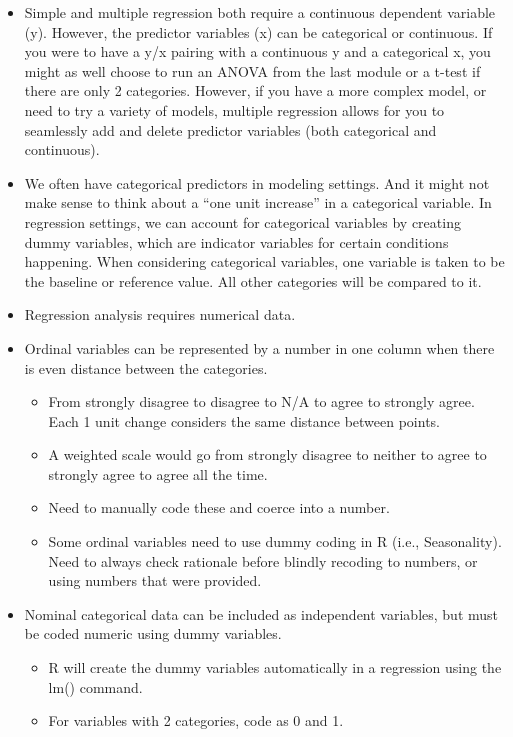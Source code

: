 \documentclass[
  letterpaper,
  DIV=11,
  numbers=noendperiod]{scrreprt}
\providecommand{\tightlist}{%
  \setlength{\itemsep}{0pt}\setlength{\parskip}{0pt}}\usepackage{longtable,booktabs,array}
\begin{document}
\begin{itemize}
\item
  Simple and multiple regression both require a continuous dependent
  variable (y). However, the predictor variables (x) can be categorical
  or continuous. If you were to have a y/x pairing with a continuous y
  and a categorical x, you might as well choose to run an ANOVA from the
  last module or a t-test if there are only 2 categories. However, if
  you have a more complex model, or need to try a variety of models,
  multiple regression allows for you to seamlessly add and delete
  predictor variables (both categorical and continuous).
\item
  We often have categorical predictors in modeling settings. And it
  might not make sense to think about a ``one unit increase'' in a
  categorical variable. In regression settings, we can account for
  categorical variables by creating dummy variables, which are indicator
  variables for certain conditions happening. When considering
  categorical variables, one variable is taken to be the baseline or
  reference value. All other categories will be compared to it.
\item
  Regression analysis requires numerical data.
\item
  Ordinal variables can be represented by a number in one column when
  there is even distance between the categories.

  \begin{itemize}
  \tightlist
  \item
    From strongly disagree to disagree to N/A to agree to strongly
    agree. Each 1 unit change considers the same distance between
    points.
  \item
    A weighted scale would go from strongly disagree to neither to agree
    to strongly agree to agree all the time.
  \item
    Need to manually code these and coerce into a number.
  \item
    Some ordinal variables need to use dummy coding in R (i.e.,
    Seasonality). Need to always check rationale before blindly recoding
    to numbers, or using numbers that were provided.
  \end{itemize}
\item
  Nominal categorical data can be included as independent variables, but
  must be coded numeric using dummy variables.

  \begin{itemize}
  \tightlist
  \item
    R will create the dummy variables automatically in a regression
    using the lm() command.
  \item
    For variables with 2 categories, code as 0 and 1.
  \end{itemize}
\end{itemize}
\end{document}
